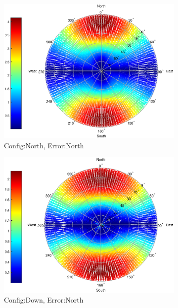 \begin{figure}
\centering
\begin{subfigure}{0.49\textwidth}
\centering
\caption{Config:North, Error:North}
\includegraphics[width =\linewidth]{ChapterExperiments/Figures/plane_Enorth_north_pow4}
\end{subfigure}
\begin{subfigure}{0.49\linewidth}
\centering
\caption{Config:Down, Error:North}
\includegraphics[width = \linewidth]{ChapterExperiments/Figures/plane_Enorth_down_pow4}
\end{subfigure}
\begin{subfigure}{0.49\textwidth}

\end{subfigure}
\end{figure}
